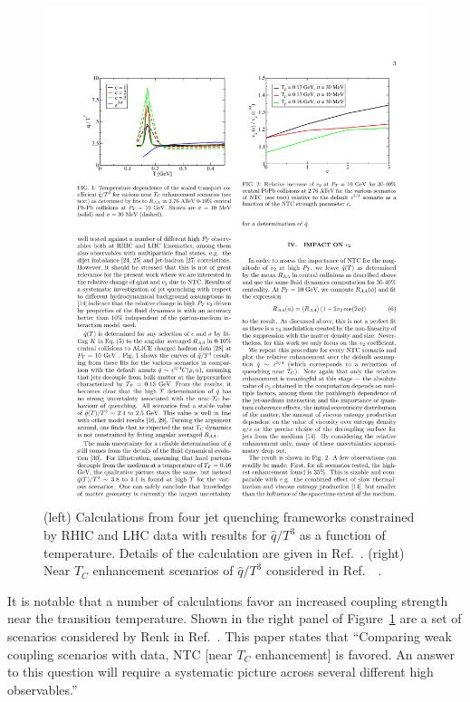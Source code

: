 \begin{figure}[ht]
  \centering
  \hfill
  \includegraphics[width=0.49\linewidth]{figs/ntce_renk}
  \caption[Calculations of $\hat{q}/T^{3}$ vs temperature, constrained
  by RHIC and LHC \raa data --- including near $T_C$ enhancement
  scenarios of $\hat{q}/T^{3}$]{(left) Calculations from four jet
    quenching frameworks constrained by RHIC and LHC \raa data
    with results for $\hat{q}/T^{3}$ as a function of temperature.
    Details of the calculation are given in
    Ref.~\cite{JETCollaboration:QhatConstraint}. (right) Near $T_C$
    enhancement scenarios of $\hat{q}/T^{3}$ considered in
    Ref.~~\cite{Renk:2014nwa}.}
  \label{fig:qhatconstraint}
\end{figure}

It is notable that a number of calculations favor an increased coupling strength near the transition temperature.  Shown in the right panel of Figure~\ref{fig:qhatconstraint} are a set of scenarios
considered by Renk in Ref.~\cite{Renk:2014nwa}.   This paper states that ``Comparing weak coupling scenarios with data, 
NTC [near $T_{C}$ enhancement] is favored.   An answer to this question will require a systematic picture 
across several different high \pt observables.''   

